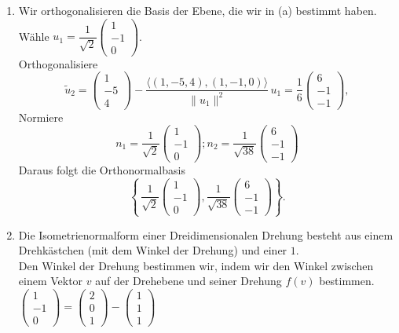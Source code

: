 \documentclass[11pt, a4paper]{article}
\begin{document}
\begin{enumerate}
  \item
  Wir orthogonalisieren die Basis der Ebene, die wir in (a) bestimmt haben.\\
  Wähle $u_1=\dfrac{1}{\sqrt2}\begin{pmatrix}1\\-1\\0\end{pmatrix}$.\\
  Orthogonalisiere \\
  \[
  \tilde u_2=\begin{pmatrix}1\\-5\\4\end{pmatrix}
  -\frac{\langle(1,-5,4),(1,-1,0)\rangle}{\|u_1\|^2}\,u_1
  =\frac{1}{6}\begin{pmatrix}6\\-1\\-1\end{pmatrix},
  \]
  Normiere \\
  \[
  n_1=\frac{1}{\sqrt{2}}\begin{pmatrix}1\\-1\\0\end{pmatrix} ; 
  n_2=\frac{1}{\sqrt{38}}\begin{pmatrix}6\\-1\\-1\end{pmatrix} 
  \]
  Daraus folgt die Orthonormalbasis
  \[
  \left\{\,
  \frac{1}{\sqrt{2}}\begin{pmatrix}1\\-1\\0\end{pmatrix},
  \frac{1}{\sqrt{38}}\begin{pmatrix}6\\-1\\-1\end{pmatrix}\right\}.
  \]
  \item
  Die Isometrienormalform einer Dreidimensionalen Drehung besteht aus einem Drehkästchen (mit dem Winkel der Drehung) und einer $1$. \\
  Den Winkel der Drehung bestimmen wir, indem wir den Winkel zwischen einem Vektor $v$ auf der Drehebene und seiner Drehung $f(v)$ bestimmen.\\
  $\begin{pmatrix}1\\-1\\0\end{pmatrix} = \begin{pmatrix}2\\0\\1\end{pmatrix} - \begin{pmatrix}1\\1\\1\end{pmatrix}$ 

\end{enumerate}
\end{document}
